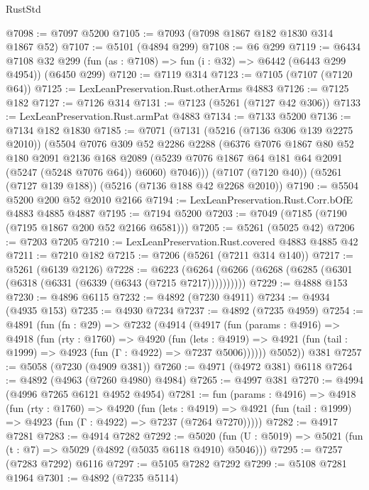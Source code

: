 \begin{lexlean}{RustStd}
\begin{coremodule}
@7098 := @7097 @5200
@7105 := @7093 (@7098 @1867 @182 @1830 @314 @1867 @52)
@7107 := @5101 (@4894 @299)
@7108 := @6 @299
@7119 := @6434
    @7108
    @32
    @299
    (fun (as : @7108) => fun (i : @32) => @6442 (@6443 @299 @4954))
    (@6450 @299)
@7120 := @7119 @314
@7123 := @7105 (@7107 (@7120 @64))
@7125 := LexLeanPreservation.Rust.otherArms @4883
@7126 := @7125 @182
@7127 := @7126 @314
@7131 := @7123 (@5261 (@7127 @42 @306))
@7133 := LexLeanPreservation.Rust.armPat @4883
@7134 := @7133 @5200
@7136 := @7134 @182 @1830
@7185 := @7071
    (@7131
      (@5216 (@7136 @306 @139 @2275 @2010))
      (@5504
        @7076
        @309
        @52
        @2286
        @2288
        (@6376
          @7076
          @1867
          @80
          @52
          @180
          @2091
          @2136
          @168
          @2089
          (@5239 @7076 @1867 @64 @181 @64 @2091 (@5247 (@5248 @7076 @64)) @6060)
          @7046)))
    (@7107 (@7120 @40))
    (@5261 (@7127 @139 @188))
    (@5216 (@7136 @188 @42 @2268 @2010))
@7190 := @5504 @5200 @200 @52 @2010 @2166
@7194 := LexLeanPreservation.Rust.Corr.bOfE @4883 @4885 @4887
@7195 := @7194 @5200
@7203 := @7049 (@7185 (@7190 (@7195 @1867 @200 @52 @2166 @6581)))
@7205 := @5261 (@5025 @42)
@7206 := @7203 @7205
@7210 := LexLeanPreservation.Rust.covered @4883 @4885 @42
@7211 := @7210 @182
@7215 := @7206 (@5261 (@7211 @314 @140))
@7217 := @5261 (@6139 @2126)
@7228 := @6223 (@6264 (@6266 (@6268 (@6285 (@6301 (@6318 (@6331 (@6339 (@6343 (@7215 @7217))))))))))
@7229 := @4888 @153
@7230 := @4896 @6115
@7232 := @4892 (@7230 @4911)
@7234 := @4934 (@4935 @153)
@7235 := @4930 @7234
@7237 := @4892 (@7235 @4959)
@7254 := @4891
    (fun (fn : @29) =>
    @7232
      (@4914
        (@4917
          (fun (params : @4916) =>
          @4918
            (fun (rty : @1760) =>
            @4920
              (fun (lets : @4919) =>
              @4921 (fun (tail : @1999) => @4923 (fun (Γ : @4922) => @7237 @5006))))))
        @5052))
    @381
@7257 := @5058 (@7230 (@4909 @381))
@7260 := @4971 (@4972 @381) @6118
@7264 := @4892 (@4963 (@7260 @4980) @4984)
@7265 := @4997 @381
@7270 := @4994 (@4996 @7265 @6121 @4952 @4954)
@7281 := fun (params : @4916) =>
  @4918
    (fun (rty : @1760) =>
    @4920
      (fun (lets : @4919) =>
      @4921 (fun (tail : @1999) => @4923 (fun (Γ : @4922) => @7237 (@7264 @7270)))))
@7282 := @4917 @7281
@7283 := @4914 @7282
@7292 := @5020 (fun (U : @5019) => @5021 (fun (t : @7) => @5029 (@4892 (@5035 @6118 @4910) @5046)))
@7295 := @7257 (@7283 @7292) @6116
@7297 := @5105 @7282 @7292
@7299 := @5108 @7281 @1964
@7301 := @4892 (@7235 @5114)

\end{coremodule}
\end{lexlean}

